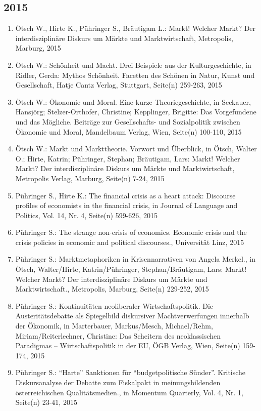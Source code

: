 \subsection*{2015}
\begin{enumerate}
    	 \item Ötsch W., Hirte K., Pühringer S., Bräutigam L.: Markt! Welcher Markt? Der interdisziplinäre Diskurs um Märkte und Marktwirtschaft, Metropolis, Marburg, 2015
	 \item Ötsch W.: Schönheit und Macht. Drei Beispiele aus der Kulturgeschichte, in Ridler, Gerda: Mythos Schönheit. Facetten des Schönen in Natur, Kunst und Gesellschaft, Hatje Cantz Verlag, Stuttgart, Seite(n) 259-263, 2015
	 \item Ötsch W.: Ökonomie und Moral. Eine kurze Theoriegeschichte, in Seckauer, Hansjörg; Stelzer-Orthofer, Christine; Kepplinger, Brigitte: Das Vorgefundene und das Mögliche. Beiträge zur Gesellschafts- und Sozialpolitik zwischen Ökonomie und Moral, Mandelbaum Verlag, Wien, Seite(n) 100-110, 2015
	 \item Ötsch W.: Markt und Markttheorie. Vorwort und Überblick, in Ötsch, Walter O.; Hirte, Katrin; Pühringer, Stephan; Bräutigam, Lars: Markt! Welcher Markt? Der interdisziplinäre Diskurs um Märkte und Marktwirtschaft, Metropolis Verlag, Marburg, Seite(n) 7-24, 2015
	 \item Pühringer S., Hirte K.: The financial crisis as a heart attack: Discourse profiles of economists in the financial crisis, in Journal of Language and Politics, Vol. 14, Nr. 4, Seite(n) 599-626, 2015
	 \item Pühringer S.: The strange non-crisis of economics. Economic crisis and the crisis policies in economic and political discourses., Universität Linz, 2015
	 \item Pühringer S.: Marktmetaphoriken in Krisennarrativen von Angela Merkel., in Ötsch, Walter/Hirte, Katrin/Pühringer, Stephan/Bräutigam, Lars: Markt! Welcher Markt? Der interdisziplinäre Diskurs um Märkte und Marktwirtschaft., Metropolis, Marburg, Seite(n) 229-252, 2015
	 \item Pühringer S.: Kontinuitäten neoliberaler Wirtschaftspolitik. Die Austeritätsdebatte als Spiegelbild diskursiver Machtverwerfungen innerhalb der Ökonomik, in Marterbauer, Markus/Mesch, Michael/Rehm, Miriam/Reiterlechner, Christine: Das Scheitern des neoklassischen Paradigmas – Wirtschaftspolitik in der EU, ÖGB Verlag, Wien, Seite(n) 159-174, 2015
	 \item Pühringer S.: “Harte” Sanktionen für “budgetpolitische Sünder”. Kritische Diskursanalyse der Debatte zum Fiskalpakt in meinungsbildenden österreichischen Qualitätsmedien., in Momentum Quarterly, Vol. 4, Nr. 1, Seite(n) 23-41, 2015

\end{enumerate}
